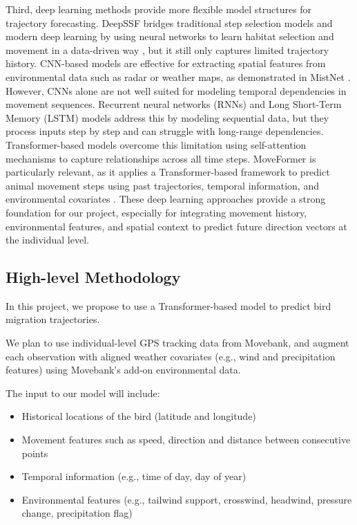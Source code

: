 \documentclass{article}
\begin{document}
Third, deep learning methods provide more flexible model structures for trajectory forecasting. DeepSSF bridges traditional step selection models and modern deep learning by using neural networks to learn habitat selection and movement in a data-driven way \cite{forrest2026deepssf}, but it still only captures limited trajectory history. CNN-based models are effective for extracting spatial features from environmental data such as radar or weather maps, as demonstrated in MistNet \cite{lin2019mistnet}. However, CNNs alone are not well suited for modeling temporal dependencies in movement sequences. Recurrent neural networks (RNNs) and Long Short-Term Memory (LSTM) models address this by modeling sequential data, but they process inputs step by step and can struggle with long-range dependencies. Transformer-based models overcome this limitation using self-attention mechanisms to capture relationships across all time steps. MoveFormer is particularly relevant, as it applies a Transformer-based framework to predict animal movement steps using past trajectories, temporal information, and environmental covariates \cite{cifka2023moveformer}. These deep learning approaches provide a strong foundation for our project, especially for integrating movement history, environmental features, and spatial context to predict future direction vectors at the individual level.

\subsection{High-level Methodology}

In this project, we propose to use a Transformer-based model to predict bird migration trajectories. 

We plan to use individual-level GPS tracking data from Movebank, and augment each observation with aligned weather covariates (e.g., wind and precipitation features) using Movebank’s add-on environmental data.

The input to our model will include:
\begin{itemize}
    \item Historical locations of the bird (latitude and longitude)
    \item Movement features such as speed, direction and distance between consecutive points
    \item Temporal information (e.g., time of day, day of year)
    \item Environmental features (e.g., tailwind support, crosswind, headwind, pressure change, precipitation flag)
\end{itemize}
\end{document}

